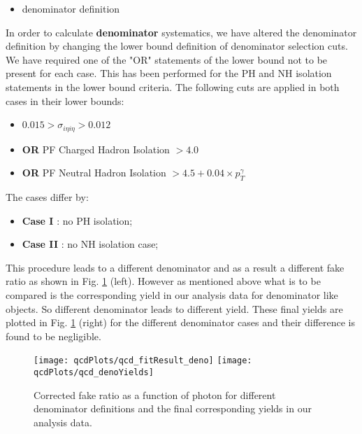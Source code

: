 \begin{itemize}
\item denominator definition
\end{itemize}

In order to calculate \textbf{denominator} systematics, we have altered the denominator definition by changing the lower bound definition of denominator selection cuts.
We have required one of the "OR" statements of the lower bound not to be present for each case. This has been performed for the PH and NH isolation statements in the lower bound criteria.  The following cuts are applied in both cases in their lower bounds:

\begin{itemize}
\item $ 0.015 > \sigma_{i\eta i\eta} > 0.012 $ \newline
\item\textbf{OR}  PF Charged Hadron Isolation $ > 4.0$ \newline
\item\textbf{OR}  PF Neutral Hadron Isolation $ > 4.5+0.04\times p_{T}^{\gamma}$ \newline
\end{itemize}

The cases differ by:
\begin{itemize}
\item {\bf Case I} : no PH isolation; \newline
\item {\bf Case II} : no NH isolation case; \newline
\end{itemize}

This procedure leads to a different denominator and as a result a different fake ratio as shown in Fig. \ref{fig:fit_DENOMsys} (left). 
However as mentioned above what is to be compared is the corresponding yield in our analysis data for denominator like objects. 
So different denominator leads to different yield. These final yields are plotted in Fig. \ref{fig:fit_DENOMsys} (right) for the different 
denominator cases and their difference is found to be negligible.

\begin{figure}[hbtp]
\centering
\texttt{[image: qcdPlots/qcd\_fitResult\_deno]}
\texttt{[image: qcdPlots/qcd\_denoYields]}
\caption{Corrected fake ratio as a function of photon \et for different denominator definitions and the final corresponding yields in our analysis data.}
\label{fig:fit_DENOMsys}
\end{figure}

